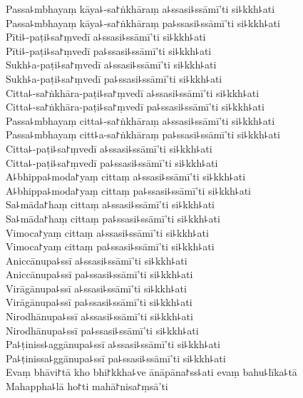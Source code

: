 \documentclass[
  babelLanguage=english,
  final,
  webversion,
]{chantingbook}
\begin{document}
Passa꜕mbhayaṃ kāya꜕-sa꜓ṅkhāraṃ a꜕ssasi꜕ssāmī'ti si꜕kkh꜕ati\\
Passa꜕mbhayaṃ kāya꜕-sa꜓ṅkhāraṃ pa꜕ssasi꜕ssāmī'ti si꜕kkh꜕ati\\
Pīti꜕-paṭi꜕sa꜓ṃvedī a꜕ssasi꜕ssāmī'ti si꜕kkh꜕ati\\
Pīti꜕-paṭi꜕sa꜓ṃvedī pa꜕ssasi꜕ssāmī'ti si꜕kkh꜕ati\\
Sukh꜕a-paṭi꜕sa꜓ṃvedī a꜕ssasi꜕ssāmī'ti si꜕kkh꜕ati\\
Sukh꜕a-paṭi꜕sa꜓ṃvedī pa꜕ssasi꜕ssāmī'ti si꜕kkh꜕ati\\
Citta꜕-sa꜓ṅkhāra-paṭi꜕sa꜓ṃvedī a꜕ssasi꜕ssāmī'ti si꜕kkh꜕ati\\
Citta꜕-sa꜓ṅkhāra-paṭi꜕sa꜓ṃvedī pa꜕ssasi꜕ssāmī'ti si꜕kkh꜕ati\\
Passa꜕mbhayaṃ citta꜕-sa꜓ṅkhāraṃ a꜕ssasi꜕ssāmī'ti si꜕kkh꜕ati\\
Passa꜕mbhayaṃ citt꜕a-sa꜓ṅkhāraṃ pa꜕ssasi꜕ssāmī'ti si꜕kkh꜕ati\\
Citta꜕-paṭi꜕sa꜓ṃvedī a꜕ssasi꜕ssāmī'ti si꜕kkh꜕ati\\
Citta꜕-paṭi꜕sa꜓ṃvedī pa꜕ssasi꜕ssāmī'ti si꜕kkh꜕ati\\
A꜕bhippa꜕moda꜓yaṃ cittaṃ a꜕ssasi꜕ssāmī'ti si꜕kkh꜕ati\\
A꜕bhippa꜕moda꜓yaṃ cittaṃ pa꜕ssasi꜕ssāmī'ti si꜕kkh꜕ati\\
Sa꜕māda꜓haṃ cittaṃ a꜕ssasi꜕ssāmī'ti si꜕kkh꜕ati\\
Sa꜕māda꜓haṃ cittaṃ pa꜕ssasi꜕ssāmī'ti si꜕kkh꜕ati\\
Vimoca꜓yaṃ cittaṃ a꜕ssasi꜕ssāmī'ti si꜕kkh꜕ati\\
Vimoca꜓yaṃ cittaṃ pa꜕ssasi꜕ssāmī'ti si꜕kkh꜕ati\\
Aniccānupa꜕ssī a꜕ssasi꜕ssāmī'ti si꜕kkh꜕ati\\
Aniccānupa꜕ssī pa꜕ssasi꜕ssāmī'ti si꜕kkh꜕ati\\
Virāgānupa꜕ssī a꜕ssasi꜕ssāmī'ti si꜕kkh꜕ati\\
Virāgānupa꜕ssī pa꜕ssasi꜕ssāmī'ti si꜕kkh꜕ati\\
Nirodhānupa꜕ssī a꜕ssasi꜕ssāmī'ti si꜕kkh꜕ati\\
Nirodhānupa꜕ssī pa꜕ssasi꜕ssāmī'ti si꜕kkh꜕ati\\
Pa꜕ṭiniss꜕aggānupa꜕ssī a꜕ssasi꜕ssāmī'ti si꜕kkh꜕ati\\
Pa꜕ṭinissa꜕ggānupa꜕ssī pa꜕ssasi꜕ssāmī'ti si꜕kkh꜕ati\\
Evaṃ bhāvi꜓tā kho bhi꜓kkha꜕ve ānāpāna꜓ss꜕ati evaṃ bahu꜕līka꜕tā\\
Mahappha꜕lā ho꜓ti mahā꜓nisa꜓ṃsā'ti
\end{document}
